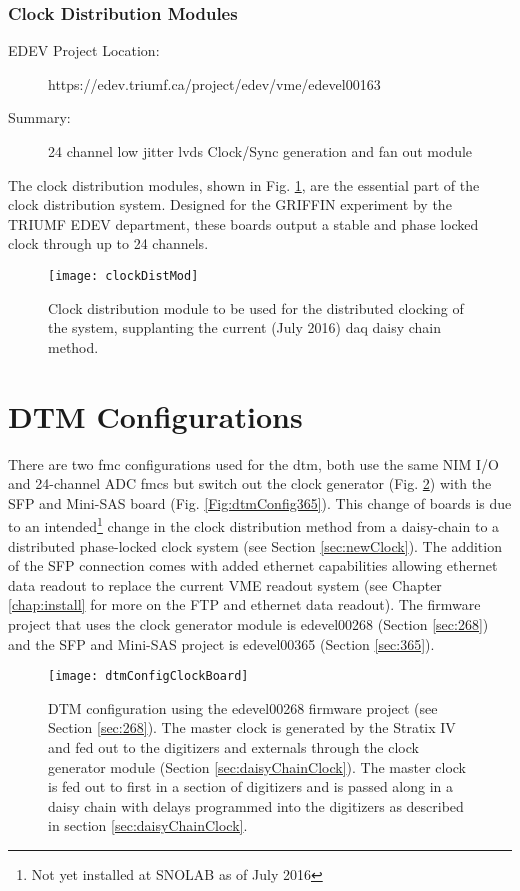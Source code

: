 \subsubsection{Clock Distribution Modules}
\begin{description}
\item[EDEV Project Location:] https://edev.triumf.ca/project/edev/vme/edevel00163
\item[Summary:] 24 channel low jitter \gls{lvds} Clock/Sync generation and fan out module
\end{description}
The clock distribution modules, shown in Fig. \ref{Fig:clockDistMod}, are the essential part of the clock distribution system. Designed for the GRIFFIN experiment by the TRIUMF EDEV department, these boards output a stable and phase locked clock through up to 24 channels. 
\begin{figure}
\centering
\texttt{[image: clockDistMod]}
\caption{Clock distribution module to be used for the distributed clocking of the system, supplanting the current (July 2016) \gls{daq} daisy chain method.}
\label{Fig:clockDistMod}
\end{figure}

\section{DTM Configurations}
\label{sec:dtmConfigs}
There are two \gls{fmc} configurations used for the \gls{dtm}, both use the same NIM I/O and 24-channel ADC \gls{fmc}s but switch out the clock generator (Fig. \ref{Fig:dtmConfig268}) with the SFP and Mini-SAS board (Fig. \ref{Fig:dtmConfig365}). This change of boards is due to an intended\footnote{Not yet installed at SNOLAB as of July 2016} change in the clock distribution method from a daisy-chain to a distributed phase-locked clock system (see Section \ref{sec:newClock}). The addition of the SFP connection comes with added ethernet capabilities allowing ethernet data readout to replace the current VME readout system (see Chapter \ref{chap:install} for more on the FTP and ethernet data readout). The firmware project that uses the clock generator module is edevel00268 (Section \ref{sec:268}) and the SFP and Mini-SAS project is edevel00365 (Section \ref{sec:365}).
\begin{figure}
\centering
\texttt{[image: dtmConfigClockBoard]}
\caption{DTM configuration using the edevel00268 firmware project (see Section \ref{sec:268}). The master clock is generated by the Stratix IV and fed out to the digitizers and externals through the clock generator module (Section \ref{sec:daisyChainClock}). The master clock is fed out to first in a section of digitizers and is passed along in a daisy chain with delays programmed into the digitizers as described in section \ref{sec:daisyChainClock}.}
\label{Fig:dtmConfig268}
\end{figure}

